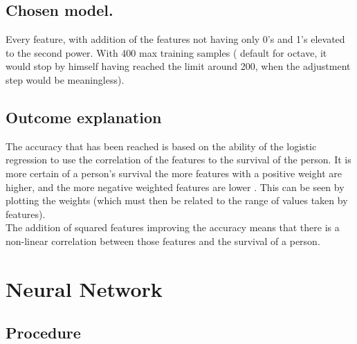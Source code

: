 \documentclass{article}
\begin{document}
\subsection{Chosen model.}
Every feature, with addition of the features not having only 0's and 1's elevated to the second power. With 400 max training samples ( default for octave, it would stop by himself having reached the limit around 200, when the adjustment step would be meaningless). 


\subsection{Outcome explanation}
The accuracy that has been reached is based on the ability of the logistic regression to use the correlation of the features to the survival of the person. It is more certain of a person's survival the more features with a positive weight are higher, and the more negative weighted features are lower . 
This can be seen by plotting the weights (which must then be related to the range of values taken by features). \\
The addition of squared features improving the accuracy means that there is a non-linear correlation between those features and the survival of a person. 
\newpage

\section{Neural Network}

\subsection{Procedure}
\end{document}
